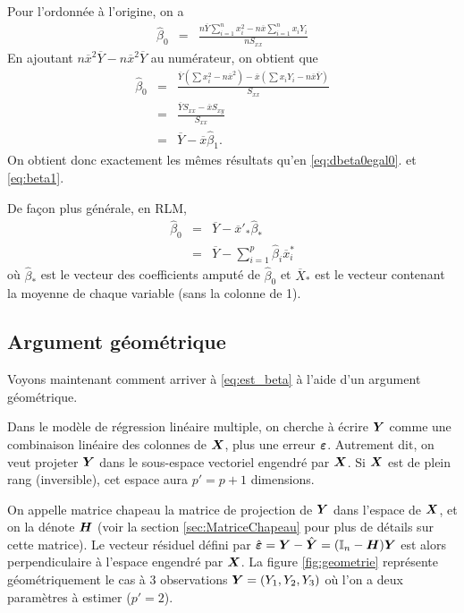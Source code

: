 Pour l'ordonnée à l'origine, on a
\begin{eqnarray*}
	\hat{\beta}_0 &=& \frac{n \overline{Y} \sum_{i=1}^n x_i^2 - n\overline{x} \sum_{i=1}^n x_i Y_i}{nS_{xx}}
\end{eqnarray*}
En ajoutant $n\overline{x}^2\overline{Y} -n\overline{x}^2\overline{Y}$ au numérateur, on obtient que
\begin{eqnarray*}
		\hat{\beta}_0 & = & \frac{\overline Y(\sum x_i^2-n\overline x^2)-\overline x(\sum x_i Y_i-n\overline x\overline Y)}{S_{xx}} \\
       &=& \frac{\overline{Y}S_{xx} - \overline{x}S_{xy}}{S_{xx}} \\
	&=& \overline{Y} - \overline{x} \hat{\beta}_1 .
\end{eqnarray*}
On obtient donc exactement les mêmes résultats qu'en \eqref{eq:dbeta0egal0}.  et \eqref{eq:beta1}.

\begin{remarque}
De façon plus générale, en RLM,
\begin{eqnarray*}
	\hat{\beta}_0 &=& \overline{Y} - \overline{x}'_* \hat{\beta}_*\\
	&=& \overline{Y} - \sum_{i=1}^p \hat{\beta}_i \overline{x}^*_i
\end{eqnarray*}
où $\hat{\beta}_*$ est le vecteur des coefficients amputé de $\hat{\beta}_0$ et $\overline{X}_*$ est le vecteur contenant la moyenne de chaque variable (sans la colonne de 1).
\end{remarque}


\subsection{Argument géométrique}
\label{sec:ArgumentGéométrique}

Voyons maintenant comment arriver à \ref{eq:est_beta} à l'aide d'un argument géométrique.

Dans le modèle de régression linéaire multiple, on cherche à écrire $\mbox{\boldmath$Y$\unboldmath}$ comme une combinaison linéaire des colonnes de $\mbox{\boldmath$X$\unboldmath}$, plus une erreur $\mbox{\boldmath$\varepsilon$\unboldmath}$. Autrement dit, on veut projeter $\mbox{\boldmath$Y$\unboldmath}$ dans le sous-espace vectoriel engendré par $\mbox{\boldmath$X$\unboldmath}$. Si $\mbox{\boldmath$X$\unboldmath}$ est de plein rang (inversible), cet espace aura $p'=p+1$ dimensions.

On appelle matrice chapeau la matrice de projection de $\mbox{\boldmath$Y$\unboldmath}$ dans l'espace de $\mbox{\boldmath$X$\unboldmath}$, et on la dénote $\mbox{\boldmath$H$\unboldmath}$ (voir la section \ref{sec:MatriceChapeau} pour plus de détails sur cette matrice). Le vecteur résiduel défini par $\hat{\mbox{\boldmath$\varepsilon$\unboldmath}} = \mbox{\boldmath$Y$\unboldmath}-\hat{\mbox{\boldmath$Y$\unboldmath}} = (\mbox{\boldmath$\mathbb{I}$\unboldmath}_n-\mbox{\boldmath$H$\unboldmath})\mbox{\boldmath$Y$\unboldmath}$ est alors perpendiculaire à l'espace engendré par $\mbox{\boldmath$X$\unboldmath}$. La figure \ref{fig:geometrie} représente géométriquement le cas à 3 observations $\mbox{\boldmath$Y$\unboldmath}=(Y_1,Y_2,Y_3)$ où l'on a deux paramètres à estimer ($p'=2$).

